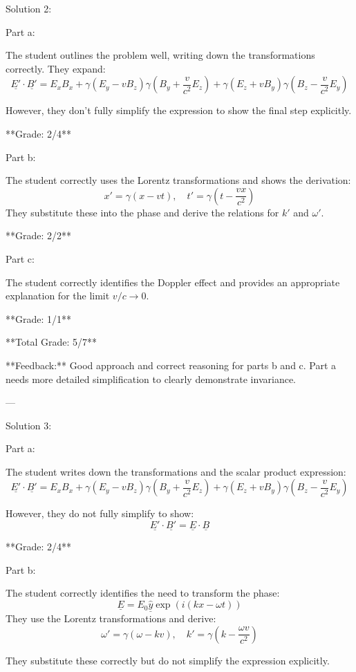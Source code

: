 \documentclass[a4paper,11pt]{article}
\begin{document}
Solution 2:

Part a:

The student outlines the problem well, writing down the transformations correctly. They expand:
\[ \underline{E'} \cdot \underline{B'} = E_{x}B_{x} + \gamma(E_{y} - vB_{z}) \gamma(B_{y} + \frac{v}{c^{2}} E_{z}) + \gamma(E_{z} + vB_{y}) \gamma(B_{z} - \frac{v}{c^{2}} E_{y}) \]

However, they don't fully simplify the expression to show the final step explicitly.

**Grade: 2/4**

Part b:

The student correctly uses the Lorentz transformations and shows the derivation:
\[ x' = \gamma(x - vt), \quad t' = \gamma \left(t - \frac{vx}{c^{2}} \right) \]
They substitute these into the phase and derive the relations for \( k' \) and \( \omega' \).

**Grade: 2/2**

Part c:

The student correctly identifies the Doppler effect and provides an appropriate explanation for the limit \( v/c \rightarrow 0 \).

**Grade: 1/1**

**Total Grade: 5/7**

**Feedback:** Good approach and correct reasoning for parts b and c. Part a needs more detailed simplification to clearly demonstrate invariance.

---

Solution 3:

Part a:

The student writes down the transformations and the scalar product expression:
\[ \underline{E'} \cdot \underline{B'} = E_{x}B_{x} + \gamma(E_{y} - vB_{z})\gamma(B_{y} + \frac{v}{c^{2}}E_{z}) + \gamma(E_{z} + vB_{y})\gamma(B_{z} - \frac{v}{c^{2}}E_{y}) \]

However, they do not fully simplify to show:
\[ \underline{E'} \cdot \underline{B'} = \underline{E} \cdot \underline{B} \]

**Grade: 2/4**

Part b:

The student correctly identifies the need to transform the phase:
\[ \underline{E} = E_{0} \hat{\underline{y}} \exp(i(kx - \omega t)) \]
They use the Lorentz transformations and derive:
\[ \omega' = \gamma(\omega - kv), \quad k' = \gamma(k - \frac{\omega v}{c^{2}}) \]

They substitute these correctly but do not simplify the expression explicitly.
\end{document}
